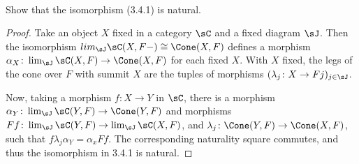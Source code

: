\documentclass[../../main]{subfiles}
\begin{document}
\paragraph{}
\begin{exercise}
Show that the isomorphism (3.4.1) is natural.
\end{exercise}


\begin{proof}
Take an object $X$ fixed in a category $\sC$ and a fixed diagram $\sJ$. Then
the isomorphism $lim_\sJ\sC(X,F-)\cong \Cone (X,F)$ defines a morphism $\alpha_X
\colon \lim_\sJ \sC(X,F) \rightarrow \Cone(X,F)$ for each fixed $X$. With $X$ fixed,
the legs of the cone over $F$ with summit $X$ are the tuples of morphisms
$(\lambda_j \colon X \rightarrow Fj)_{j \in \sJ}$. 

Now, taking a morphism $f\colon X \rightarrow Y$ in $\sC$, there is a morphism
$\alpha_Y\colon \lim_\sJ\sC(Y,F) \rightarrow \Cone(Y,F)$ and morphisms $Ff \colon \lim_\sJ \sC(Y, F)
\rightarrow \lim_\sJ \sC(X,F)$, and $\lambda_j \colon \Cone(Y,F) \rightarrow \Cone(X,F)$,
such that $f\lambda_j\alpha_Y = \alpha_xFf$. The corresponding naturality
square commutes, and thus the isomorphism in 3.4.1 is natural. 

	
\end{proof}	
	
\end{document}
